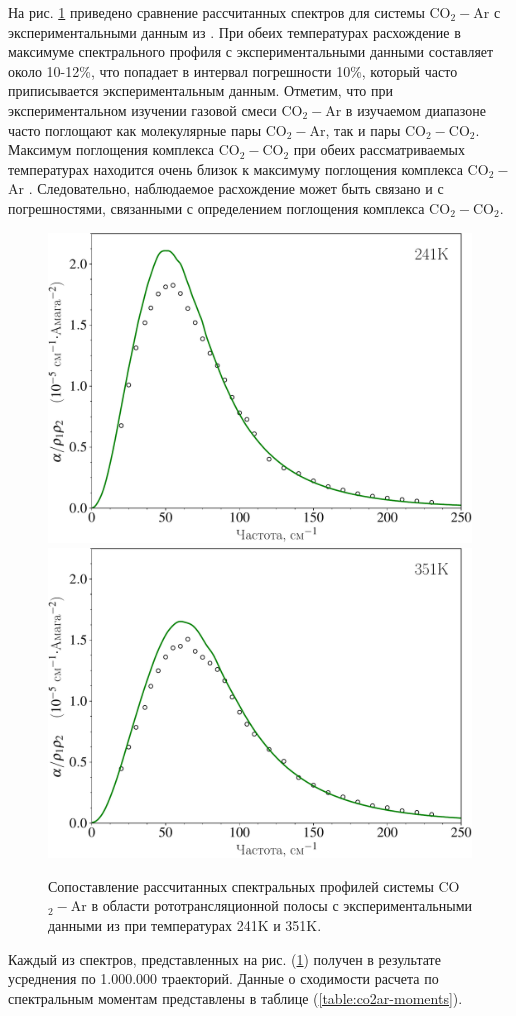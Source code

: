 На рис. \ref{fig:co2ar-spectra} приведено сравнение рассчитанных спектров для системы CO$_2-$Ar с экспериментальными данным из \cite{tonkov1995}. При обеих температурах расхождение в максимуме спектрального профиля с экспериментальными данными составляет около 10-12\%, что попадает в интервал погрешности 10\%, который часто приписывается экспериментальным данным.
Отметим, что при экспериментальном изучении газовой смеси CO$_2-$Ar в изучаемом диапазоне часто поглощают как молекулярные пары CO$_2-$Ar, так и пары CO$_2-$CO$_2$. Максимум поглощения комплекса CO$_2-$CO$_2$ при обеих рассматриваемых температурах находится очень близок к максимуму поглощения комплекса CO$_2-$Ar \cite{gruszka1997}. Следовательно, наблюдаемое расхождение может быть связано и с погрешностями, связанными с определением поглощения комплекса CO$_2-$CO$_2$.

\begin{figure}[H]
    \centering
    \includegraphics[width=0.49\linewidth]{./pictures/polyatom_spectra/co2_ar/241K_russian-crop.pdf}
    \includegraphics[width=0.49\linewidth]{./pictures/polyatom_spectra/co2_ar/351K_russian-crop.pdf}
    \label{fig:co2ar-spectra}
    \caption{Сопоставление рассчитанных спектральных профилей системы CO$_2-$Ar в области рототрансляционной полосы с экспериментальными данными из \cite{tonkov1995} при температурах 241K и 351K.}
\end{figure}

Каждый из спектров, представленных на рис. (\ref{fig:co2ar-spectra}) получен в результате усреднения по 1.000.000 траекторий. Данные о сходимости расчета по спектральным моментам представлены в таблице (\ref{table:co2ar-moments}). 


